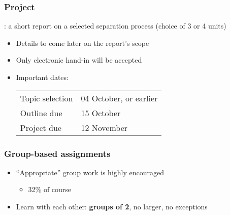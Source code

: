\begin{frame}\frametitle{Project}
	\begin{exampleblock}{}
		\textbf{{\color{myBlue}{AIM}}}: a short report on a selected separation process (choice of 3 or 4 units)
	\end{exampleblock}
	\begin{itemize}
		\item	Details to come later on the report's scope
		\item	Only electronic hand-in will be accepted
		\item	Important dates: 
		
		\vspace{12pt}
		\begin{tabular}{ll}
			Topic selection & 04 October, or earlier\\
			Outline due & 15 October\\
			Project due & 12 November\\
		\end{tabular}
	\end{itemize}
\end{frame}

\begin{frame}\frametitle{Group-based assignments}
	\begin{itemize}
		\item	``Appropriate'' group work is highly encouraged 
		\begin{itemize}
			\item	32\% of course
		\end{itemize}
		\item	Learn with each other: \textbf{groups of 2}, no larger, no exceptions
	\end{itemize}
\end{frame}

